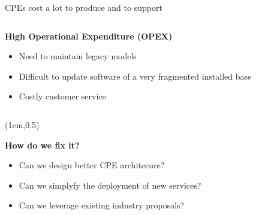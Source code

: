 \documentclass[a4paper]{beamer}
\begin{document}
\begin{frame}{CPEs cost a lot to produce and to support}
\begin{columns}[T]
\begin{column}[T]{0.75 \textwidth}
																																		   
			\textbf{ High Operational Expenditure (OPEX)}
			\begin{itemize}
				\item Need to maintain legacy models
				\item Difficult to update software of a very fragmented installed base
				\item Costly customer service 
			\end{itemize}
																																		     
																																	
		\end{column}
																						
	\end{columns}
									
								
	\begin{textblock*}{10cm}(1cm,0.5\textheight)
		\begin{alertblock}{}
			\textbf{  How do we fix it? }
			\begin{itemize}
				\item Can we design better CPE architecure?
				\item Can we simplyfy the deployment of new services?
				\item Can we leverage existing industry proposals?
			\end{itemize}
		\end{alertblock}
	\end{textblock*}
									
\end{frame}
\end{document}
